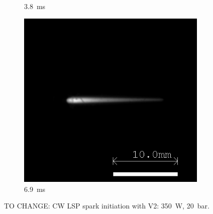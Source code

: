 \begin{figure}[!ht]
\begin{subfigure}[t]{0.3\textwidth}
        \caption{\qty{3.8}{ms}}
    \end{subfigure}
    \hfill
    \begin{subfigure}[t]{0.3\textwidth}
        \centering
        \includegraphics[width=\textwidth]{assets/4 experiments/V1 Spark Ignition Frames/LSP142_SPRK15_Fr69.png}
        \caption{\qty{6.9}{ms}}
    \end{subfigure}
    \caption{TO CHANGE: CW LSP spark initiation with V2: \qty{350}{W}, \qty{20}{bar}. }
    \label{fig:V1_spark_initiation_frames}
\end{figure}